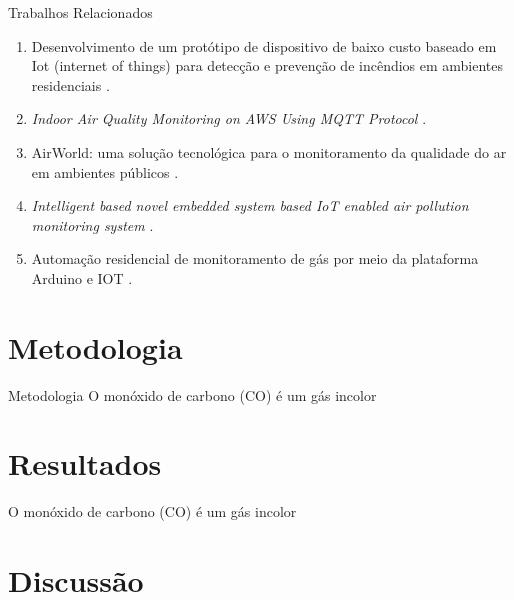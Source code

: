 \documentclass[12pt]{beamer}
\begin{document}
    \begin{frame}{Trabalhos Relacionados}
        \begin{enumerate}
            \item Desenvolvimento de um protótipo de dispositivo de baixo custo baseado em Iot (internet of things) para detecção e prevenção de incêndios em ambientes residenciais \cite{uea-iot-deteccao-incendio}.
            \item \textit{Indoor Air Quality Monitoring on AWS Using MQTT Protocol} \cite{iot-monitoring-on-aws}.
            \item AirWorld: uma solução tecnológica para o monitoramento da qualidade do ar em ambientes públicos \cite{UFAMAirWorld}.
            \item \textit{Intelligent based novel embedded system based IoT enabled
            air pollution monitoring system} \cite{tbRelacionado4NovelEmbeddedSystem}.
            \item Automação residencial de monitoramento de gás por meio da plataforma Arduino e IOT \cite{alexandre-automaccao-formulas-de-leitura-sensor}.
        \end{enumerate}
    \end{frame}

    \section{Metodologia}

    \begin{frame}{Metodologia}
        O monóxido de carbono (CO) é um gás incolor 
    \end{frame}

    \section{Resultados}

    \begin{frame}
        O monóxido de carbono (CO) é um gás incolor 
    \end{frame}

    \section{Discussão}
\end{document}
